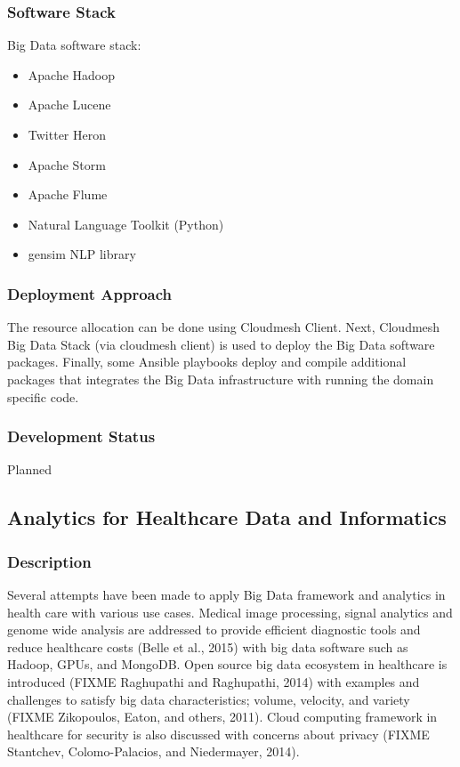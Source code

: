 \documentclass[9pt,twocolumn,twoside]{styles/osajnl}
\begin{document}
\subsubsection{Software Stack}

Big Data software stack:

\begin{itemize}
\item Apache Hadoop
\item Apache Lucene
\item Twitter Heron
\item Apache Storm
\item Apache Flume
\item Natural Language Toolkit (Python)
\item gensim NLP library
\end{itemize}

\subsubsection{Deployment Approach}

The resource allocation can be done using Cloudmesh Client.  Next,
Cloudmesh Big Data Stack (via cloudmesh client) is used to deploy the
Big Data software packages.  Finally, some Ansible playbooks deploy
and compile additional packages that integrates the Big Data
infrastructure with running the domain specific code.

\subsubsection{Development Status}

Planned


\subsection{Analytics for Healthcare Data and Informatics}

\subsubsection{Description}

Several attempts have been made to apply Big Data framework and
analytics in health care with various use cases. Medical image
processing, signal analytics and genome wide analysis are addressed to
provide efficient diagnostic tools and reduce healthcare costs (Belle
et al., 2015) with big data software such as Hadoop, GPUs, and
MongoDB. Open source big data ecosystem in healthcare is introduced
(FIXME Raghupathi and Raghupathi, 2014) with examples and challenges
to satisfy big data characteristics; volume, velocity, and variety
(FIXME Zikopoulos, Eaton, and others, 2011). Cloud computing framework
in healthcare for security is also discussed with concerns about
privacy (FIXME Stantchev, Colomo-Palacios, and Niedermayer, 2014).
\end{document}
